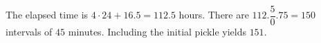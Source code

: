 The elapsed time is $4\cdot 24+16.5=112.5$ hours. There are $112.\dfrac{5}{0}.75=150$ intervals of $45$ minutes. Including the initial pickle yields $\boxed{151}$.
